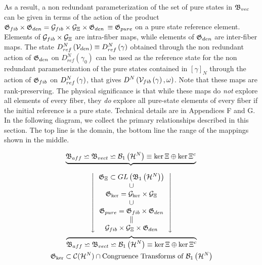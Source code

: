 As a result, a non redundant parameterization of the set of pure states in $%
{\frak B}_{vec}$ can be given in terms of the action of the product ${\frak G%
}_{fib}\times {\frak G}_{den}={\cal G}_{fib}\times {\cal G}_{\Xi }\times 
{\frak G}_{den}$ $\equiv {\frak G}_{pure}$ on a pure state reference
element. Elements of ${\cal G}_{fib}\times {\cal G}_{\Xi }$ are intra-fiber
maps, while elements of ${\frak G}_{den}$ are inter-fiber maps. The state $%
D_{ref}^{N}\left( {\cal V}_{den}\right) \equiv D_{ref}^{N}\left( {\cal %
\gamma }\right) $ obtained through the non redundant action of ${\frak G}%
_{den}$ on $D_{ref}^{N}\left( \gamma _{0}\right) $ can be used as the
reference state for the non redundant parameterization of the pure states
contained in $\left[ \gamma \right] _{N}$ through the action of ${\frak G}%
_{fib}$ on $D_{ref}^{N}\left( {\cal \gamma }\right) $, that gives $%
D^{N}\left( {\cal V}_{fib}\left( \gamma \right) ,{\cal \omega }\right) $.
Note that these maps are rank-preserving. The physical significance is that
while these maps do {\em not} explore all elements of every fiber, they {\em %
do} explore all pure-state elements of every fiber if the initial reference
is a pure state. Technical details are in Appendices F and G. In the
following diagram, we collect the primary relationships described in this
section. The top line is the domain, the bottom line the range of the
mappings shown in the middle.

\begin{gather}
\underbrace{{\frak B}_{aff}\backsimeq {\frak B}_{vect}\backsimeq {\cal B}%
_{1}\left( {\cal H}^{N}\right) \equiv \ker \Xi \oplus \ker \Xi ^{c}}%
\mathstrut \medskip  \nonumber \\
\left\downarrow 
\begin{array}{c}
{\frak G}_{\Xi }\subset GL\left( {\frak B}_{1}\left( {\cal H}^{N}\right)
\right) \\ 
\cup \\ 
{\frak G}_{\ker }={\cal G}_{\ker }\times {\cal G}_{\Xi } \\ 
\cup \\ 
{\frak G}_{pure}={\frak G}_{fib}\times {\frak G}_{den} \\ 
{\LARGE \parallel } \\ 
{\cal G}_{fib}\times {\cal G}_{\Xi }\times {\frak G}_{den}%
\end{array}%
\right\downarrow  \nonumber \\
\overbrace{{\frak B}_{aff}\backsimeq {\frak B}_{vect}\backsimeq {\cal B}%
_{1}\left( {\cal H}^{N}\right) \equiv \ker \Xi \oplus \ker \Xi ^{c}} 
\nonumber \\
{\frak G}_{\ker }\subset {\cal C}({\cal H}^{N})\cap \text{Congruence
Transforms of }{\cal B}_{1}\left( {\cal H}^{N}\right)
\end{gather}

